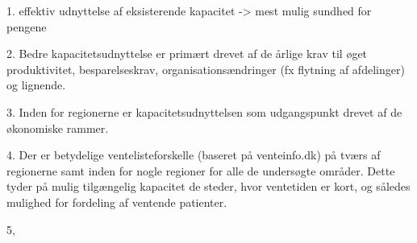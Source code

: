 1. effektiv udnyttelse af eksisterende kapacitet -> mest mulig sundhed for pengene

2. Bedre kapacitetsudnyttelse er primært drevet af de årlige krav til øget produktivitet, besparelseskrav, organisationsændringer (fx flytning af afdelinger) og lignende.

3. Inden for regionerne er kapacitetsudnyttelsen som udgangspunkt drevet af de økonomiske rammer.

4. Der er betydelige ventelisteforskelle (baseret på venteinfo.dk) på tværs af regionerne samt inden for nogle regioner for alle de undersøgte områder. Dette tyder på mulig tilgængelig kapacitet de steder, hvor ventetiden er kort, og således mulighed for fordeling af ventende patienter.

5, 
